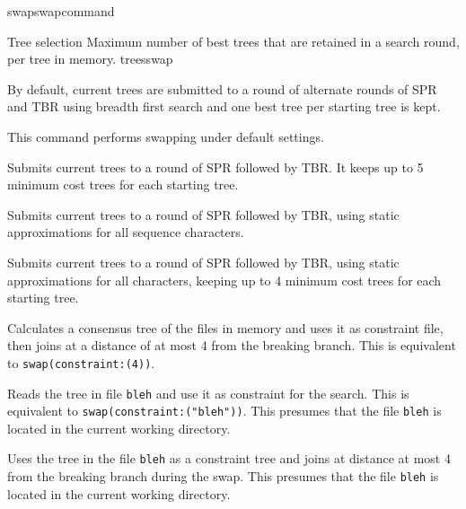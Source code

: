 \begin{command}{swap}{swapcommand}
\begin{arguments}
\begin{argumentgroup}{Tree selection}
                {Maximum number of best trees that are retained in a search round,
                per tree in memory.}
                {treesswap}

        \end{argumentgroup}
    
    \end{arguments}

        {By default, current trees are submitted to a round of alternate rounds of SPR and TBR using breadth first search and one best tree per starting tree is kept.}

    \begin{poyexamples}
            {This command performs swapping under default settings.}

            {Submits current trees to a round of SPR followed by TBR. It keeps
            up to 5 minimum cost trees for each starting tree.}

            {Submits current trees to a round of SPR followed by TBR, using
            static approximations for all sequence characters.}
            
            {Submits current trees to a round of SPR followed by TBR, using
            static approximations for all characters, keeping up to 4 minimum
            cost trees for each starting tree.}
            
            {Calculates a consensus tree of the files in memory and uses it as
            constraint file, then joins at a distance of at most 4 from the breaking
            branch. This is equivalent to \texttt{swap(constraint:(4))}.}
    
            {Reads the tree in file \texttt{bleh} and use it as constraint for the
            search. This is equivalent to \texttt{swap(constraint:("bleh"))}. This 
            presumes that the file \texttt{bleh} is located in the current working directory.}    
        
            {Uses the tree in the file \texttt{bleh} as a constraint tree and joins at
            distance at most 4 from the breaking branch during the swap.  This 
            presumes that the file \texttt{bleh} is located in the current working directory.}
        

\end{poyexamples}
\end{command}
